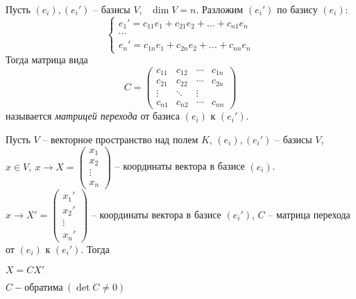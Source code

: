 \begin{Def}
	Пусть $(e_i), (e_i')$ -- базисы $V$, \ $\dim V = n$. Разложим $(e_i')$ по базису $(e_i):$   
	\[\begin{cases}
		e_1' = c_{11}e_1 + c_{21}e_2 + ... + c_{n1}e_n \\ 
		\cdots\\
		e_n' = c_{1n}e_1 + c_{2n}e_2 + ... + c_{nn}e_n
	\end{cases}\]
	Тогда матрица вида 
	\[C = 
	\left(\begin{array}{cccc}
		c_{11} & c_{12} & \cdots & c_{1n} \\ 
		c_{21} & c_{22} & \cdots & c_{2n} \\
		\vdots & \ddots & \vdots \\
		c_{n1} & c_{n2} & \cdots & c_{nn}
		\end{array}\right)\]
	называется \textit{матрицей перехода}  от базиса $(e_i)$ к $(e_i')$.
\end{Def}

\begin{Thm}
	Пусть $V$ -- векторное пространство над полем $K$, $(e_i), (e_i')$ -- базисы $V$, $x\in V, \ x \to X = 
	\left(\begin{array}{c}
		x_1 \\ 
		x_2 \\ 
		\vdots \\ 
		x_n
		\end{array}\right) $ -- координаты вектора в базисе $(e_i)$. $x \to X' = 
		\left(\begin{array}{c}
		x_1' \\ 
		x_2' \\ 
		\vdots \\ 
		x_n'
		\end{array}\right)$ -- координаты вектора в базисе $(e_i')$, $C$ -- матрица перехода от $(e_i)$ к $(e_i')$. Тогда
	\begin{MyList}
		\item $X = CX'$
		\item $C - \text{обратима} \ (\det C \neq 0)$		
	\end{MyList}
\end{Thm}

